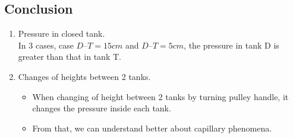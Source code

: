\subsection{Conclusion}
\begin{enumerate}[label=\alph*)]
	\item Pressure in closed tank.\\
	In 3 cases, case $D – T = 15cm$ and  $D – T = 5cm$, the pressure in tank D is greater than that in tank T.
	\item Changes of heights between 2 tanks.
	\begin{itemize}[label=-]
		\item When changing of height between 2 tanks by turning pulley handle, it changes the pressure inside each tank.
		\item From that, we can understand better about capillary phenomena.
	\end{itemize}
\end{enumerate}